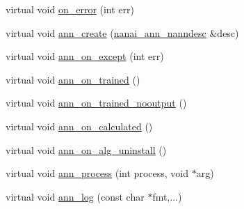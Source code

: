 \begin{DoxyCompactItemize}
\item 
virtual void \hyperlink{classnanai_1_1nanai__ann__nanncalc_a675afb775a34013e6aff1f8d669e7de0}{on\+\_\+error} (int err)
\item 
virtual void \hyperlink{classnanai_1_1nanai__ann__nanncalc_a05aa50ca275dade2e3ef735df4a5114d}{ann\+\_\+create} (\hyperlink{namespacenanai_a892a8c80381d0005a076b68fbbf2d918}{nanai\+\_\+ann\+\_\+nanndesc} \&desc)
\item 
virtual void \hyperlink{classnanai_1_1nanai__ann__nanncalc_aa83cff70c2111905341f6b62c9ebd727}{ann\+\_\+on\+\_\+except} (int err)
\item 
virtual void \hyperlink{classnanai_1_1nanai__ann__nanncalc_aa06770b84f20aee6463d57d50c85eb0b}{ann\+\_\+on\+\_\+trained} ()
\item 
virtual void \hyperlink{classnanai_1_1nanai__ann__nanncalc_a718b94361144b9d57eca8e9f665e713a}{ann\+\_\+on\+\_\+trained\+\_\+nooutput} ()
\item 
virtual void \hyperlink{classnanai_1_1nanai__ann__nanncalc_a1d59205c70a0aae1acd02ccd513c64ae}{ann\+\_\+on\+\_\+calculated} ()
\item 
virtual void \hyperlink{classnanai_1_1nanai__ann__nanncalc_ae7fd1a715938713b89830f78bb946c97}{ann\+\_\+on\+\_\+alg\+\_\+uninstall} ()
\item 
virtual void \hyperlink{classnanai_1_1nanai__ann__nanncalc_a20f343f658f4babef5552133159f6c63}{ann\+\_\+process} (int process, void $\ast$arg)
\item 
virtual void \hyperlink{classnanai_1_1nanai__ann__nanncalc_a54ed62943cc681da143bb6a2e1782430}{ann\+\_\+log} (const char $\ast$fmt,...)
\end{DoxyCompactItemize}
